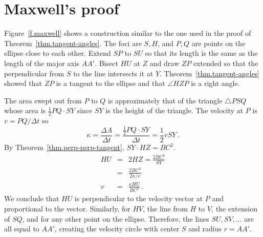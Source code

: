 
\section{Maxwell's proof}

Figure~\ref{f.maxwell} shows a construction similar to the one used in the proof of Theorem~\ref{thm.tangent-angles}. The foci are $S,H$, and $P,Q$ are points on the ellipse close to each other. Extend $SP$ to $SU$ so that its length is the same as the length of the major axis $AA'$. Bisect $HU$ at $Z$ and draw $ZP$ extended so that the perpendicular from $S$ to the line intersects it at $Y$. Theorem~\ref{thm.tangent-angles} showed that $ZP$ is a tangent to the ellipse and that $\angle HZP$ is a right angle.

The area swept out from $P$ to $Q$ is approximately that of the triangle $\triangle PSQ$ whose area is $\frac{1}{2}PQ\cdot SY$ since $SY$ is the height of the triangle. The velocity at $P$ is $v=PQ/\Delta t$ so
\[
\kappa = \frac{\Delta A}{\Delta t} = \frac{\frac{1}{2}PQ\cdot SY}{\Delta t} = \frac{1}{2}v SY\,.
\]
By Theorem~\ref{thm.perp-perp-tangent}, $SY\cdot HZ=BC^2$.
\begin{eqnarray*}
HU&=& 2HZ = \frac{2BC^2}{SY}\\
&=& \frac{2BC^2}{2\kappa/v}\\
v &=& \frac{\kappa HU}{BC^2}\,.
\end{eqnarray*}
We conclude that $HU$ is perpendicular to the velocity vector at $P$ and proportional to the vector. Similarly, for $HV$, the line from $H$ to $V$, the extension of $SQ$, and for any other point on the ellipse. Therefore, the lines $SU, SV, \ldots$ are all equal to $AA'$, creating the velocity  circle with center $S$ and radius $r=AA'$.

